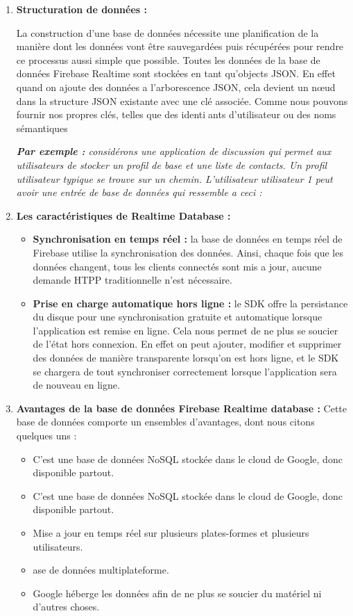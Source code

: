 \begin{enumerate}

\item \textbf{Structuration de données :}

La construction d'une base de données nécessite une planification de la manière dont les données vont être sauvegardées puis récupérées pour rendre ce processus aussi simple que possible.
Toutes les données de la base de données Firebase Realtime sont stockées en tant qu'objects JSON. En effet quand on ajoute des données a l'arborescence JSON, cela devient un nœud dans la structure JSON existante avec une clé associée. Comme nous pouvons fournir nos propres clés, telles que des identiants d'utilisateur ou des noms sémantiques

\textit{\textbf {Par exemple :} considérons une application de discussion qui permet aux
utilisateurs de stocker un profil de base et une liste de contacts. Un profil utilisateur typique se trouve sur un chemin. L'utilisateur utilisateur 1 peut avoir une entrée de base de données qui ressemble a ceci :}

\item \textbf{Les caractéristiques de Realtime Database :}
\begin{itemize}
\item \textbf{Synchronisation en temps réel :} la base de données en temps réel de Firebase utilise la synchronisation des données. Ainsi, chaque fois que les données changent, tous les clients connectés sont mis a jour, aucune demande HTPP traditionnelle n'est nécessaire.
\item \textbf{Prise en charge automatique hors ligne :} le SDK offre la persistance du disque pour une synchronisation gratuite et automatique lorsque l'application est remise en ligne. Cela nous permet de ne plus se soucier de l'état hors connexion. En effet on peut ajouter, modifier et supprimer des données de manière transparente lorsqu'on est hors ligne, et le SDK se chargera de tout synchroniser correctement lorsque l'application sera de nouveau en ligne.
\end{itemize}

\item \textbf{Avantages de la base de données Firebase Realtime database :} 
Cette base de données comporte un ensembles d'avantages, dont nous citons
quelques uns :
\begin{itemize}
\item C'est une base de données NoSQL stockée dans le cloud de Google, donc disponible partout.
\item C'est une base de données NoSQL stockée dans le cloud de Google, donc disponible partout.
\item Mise a jour en temps réel sur plusieurs plates-formes et plusieurs utilisateurs.
\item ase de données multiplateforme.
\item Google héberge les données afin de ne plus se soucier du matériel ni d'autres choses.
\end{itemize}

\end{enumerate}

